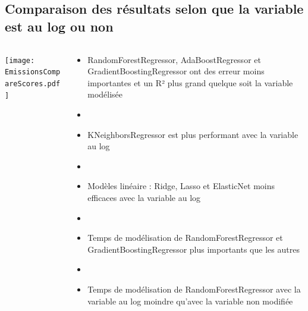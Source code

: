 \documentclass[8pt,aspectratio=169,hyperref={unicode=true}]{beamer}
\begin{document}
\subsection{Comparaison des résultats selon que la variable est au log ou non}
\begin{frame}{\insertsubsection}
  \begin{columns}
    \begin{column}{.5\textwidth}
      \centering
      \texttt{[image: EmissionsCompareScores.pdf]}
    \end{column}
    \begin{column}{.5\textwidth}
      \begin{itemize}
        \item RandomForestRegressor, AdaBoostRegressor et GradientBoostingRegressor ont
              des erreur moins importantes et un R² plus grand quelque soit la variable modélisée
        \item[]
        \item KNeighborsRegressor est plus performant avec la variable au log
        \item[]
        \item Modèles linéaire : Ridge, Lasso et ElasticNet moins efficaces avec la variable au log
        \item[]
        \item Temps de modélisation de RandomForestRegressor et GradientBoostingRegressor
              plus importants que les autres
        \item[]
        \item Temps de modélisation de RandomForestRegressor avec la variable au log moindre
              qu'avec la variable non modifiée
      \end{itemize}
    \end{column}
  \end{columns}
\end{frame}
\end{document}
